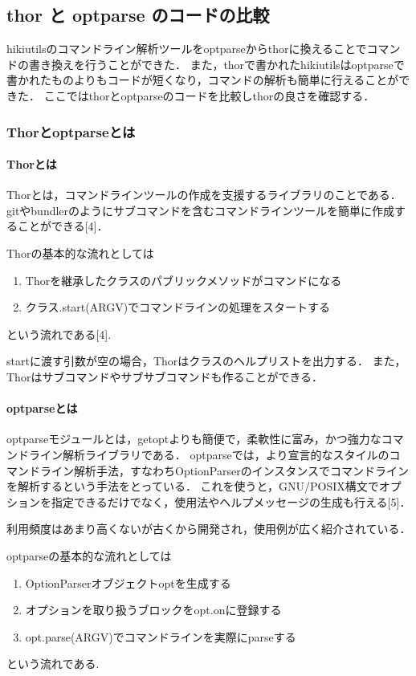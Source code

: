 
\subsection{thor と optparse のコードの比較}
hikiutilsのコマンドライン解析ツールをoptparseからthorに換えることでコマンドの書き換えを行うことができた．
また，thorで書かれたhikiutilsはoptparseで書かれたものよりもコードが短くなり，コマンドの解析も簡単に行えることができた．
ここではthorとoptparseのコードを比較しthorの良さを確認する．

\subsubsection{Thorとoptparseとは}
\paragraph{Thorとは}
Thorとは，コマンドラインツールの作成を支援するライブラリのことである．
gitやbundlerのようにサブコマンドを含むコマンドラインツールを簡単に作成することができる[4]．

Thorの基本的な流れとしては

\begin{enumerate}
\item Thorを継承したクラスのパブリックメソッドがコマンドになる
\item クラス.start(ARGV)でコマンドラインの処理をスタートする
\end{enumerate}
という流れである[4].

startに渡す引数が空の場合，Thorはクラスのヘルプリストを出力する．
また，Thorはサブコマンドやサブサブコマンドも作ることができる．

\paragraph{optparseとは}
optparseモジュールとは，getoptよりも簡便で，柔軟性に富み，かつ強力なコマンドライン解析ライブラリである．
optparseでは，より宣言的なスタイルのコマンドライン解析手法，すなわちOptionParserのインスタンスでコマンドラインを解析するという手法をとっている．
これを使うと，GNU/POSIX構文でオプションを指定できるだけでなく，使用法やヘルプメッセージの生成も行える[5]．

利用頻度はあまり高くないが古くから開発され，使用例が広く紹介されている．

optparseの基本的な流れとしては

\begin{enumerate}
\item OptionParserオブジェクトoptを生成する
\item オプションを取り扱うブロックをopt.onに登録する
\item opt.parse(ARGV)でコマンドラインを実際にparseする
\end{enumerate}
という流れである.

